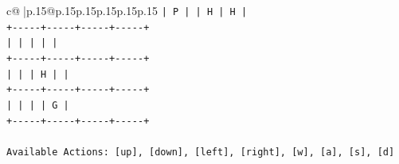 \documentclass{article}
\begin{document}
{\begin{supertabular}{c@{$\;$}|p{.15\linewidth}@{}p{.15\linewidth}p{.15\linewidth}p{.15\linewidth}p{.15\linewidth}p{.15\linewidth}}
{{{\texttt{|  P  |     |  H  |  H  |} \\
\texttt{+{-}{-}{-}{-}{-}+{-}{-}{-}{-}{-}+{-}{-}{-}{-}{-}+{-}{-}{-}{-}{-}+} \\
\texttt{|     |     |     |     |} \\
\texttt{+{-}{-}{-}{-}{-}+{-}{-}{-}{-}{-}+{-}{-}{-}{-}{-}+{-}{-}{-}{-}{-}+} \\
\texttt{|     |     |  H  |     |} \\
\texttt{+{-}{-}{-}{-}{-}+{-}{-}{-}{-}{-}+{-}{-}{-}{-}{-}+{-}{-}{-}{-}{-}+} \\
\texttt{|     |     |     |  G  |} \\
\texttt{+{-}{-}{-}{-}{-}+{-}{-}{-}{-}{-}+{-}{-}{-}{-}{-}+{-}{-}{-}{-}{-}+} \\
\\ 
\texttt{Available Actions: {[}up{]}, {[}down{]}, {[}left{]}, {[}right{]}, {[}w{]}, {[}a{]}, {[}s{]}, {[}d{]}} \\
            }
        }
    }
     \\ \\


\end{supertabular}}
\end{document}
